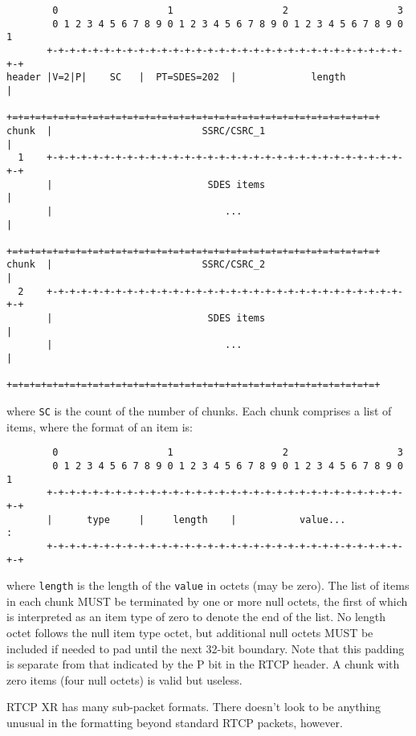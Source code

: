 \documentclass[10pt,a4paper]{article}
\begin{document}
\footnotesize
\begin{verbatim}
        0                   1                   2                   3
        0 1 2 3 4 5 6 7 8 9 0 1 2 3 4 5 6 7 8 9 0 1 2 3 4 5 6 7 8 9 0 1
       +-+-+-+-+-+-+-+-+-+-+-+-+-+-+-+-+-+-+-+-+-+-+-+-+-+-+-+-+-+-+-+-+
header |V=2|P|    SC   |  PT=SDES=202  |             length            |
       +=+=+=+=+=+=+=+=+=+=+=+=+=+=+=+=+=+=+=+=+=+=+=+=+=+=+=+=+=+=+=+=+
chunk  |                          SSRC/CSRC_1                          |
  1    +-+-+-+-+-+-+-+-+-+-+-+-+-+-+-+-+-+-+-+-+-+-+-+-+-+-+-+-+-+-+-+-+
       |                           SDES items                          |
       |                              ...                              |
       +=+=+=+=+=+=+=+=+=+=+=+=+=+=+=+=+=+=+=+=+=+=+=+=+=+=+=+=+=+=+=+=+
chunk  |                          SSRC/CSRC_2                          |
  2    +-+-+-+-+-+-+-+-+-+-+-+-+-+-+-+-+-+-+-+-+-+-+-+-+-+-+-+-+-+-+-+-+
       |                           SDES items                          |
       |                              ...                              |
       +=+=+=+=+=+=+=+=+=+=+=+=+=+=+=+=+=+=+=+=+=+=+=+=+=+=+=+=+=+=+=+=+
\end{verbatim}
\normalsize

where \verb|SC| is the count of the number of chunks. Each chunk comprises
a list of items, where the format of an item is:
\footnotesize
\begin{verbatim}
        0                   1                   2                   3
        0 1 2 3 4 5 6 7 8 9 0 1 2 3 4 5 6 7 8 9 0 1 2 3 4 5 6 7 8 9 0 1
       +-+-+-+-+-+-+-+-+-+-+-+-+-+-+-+-+-+-+-+-+-+-+-+-+-+-+-+-+-+-+-+-+
       |      type     |     length    |           value...            :
       +-+-+-+-+-+-+-+-+-+-+-+-+-+-+-+-+-+-+-+-+-+-+-+-+-+-+-+-+-+-+-+-+
\end{verbatim}
\normalsize
where \verb|length| is the length of the \verb|value| in octets (may be
zero).  The list of items in each chunk MUST be terminated by one or more
null octets, the first of which is interpreted as an item type of zero to
denote the end of the list.  No length octet follows the null item type
octet, but additional null octets MUST be included if needed to pad until
the next 32-bit boundary.  Note that this padding is separate from that
indicated by the P bit in the RTCP header.  A chunk with zero items (four
null octets) is valid but useless.

RTCP XR has many sub-packet formats. There doesn't look to be anything
unusual in the formatting beyond standard RTCP packets, however.
\end{document}
